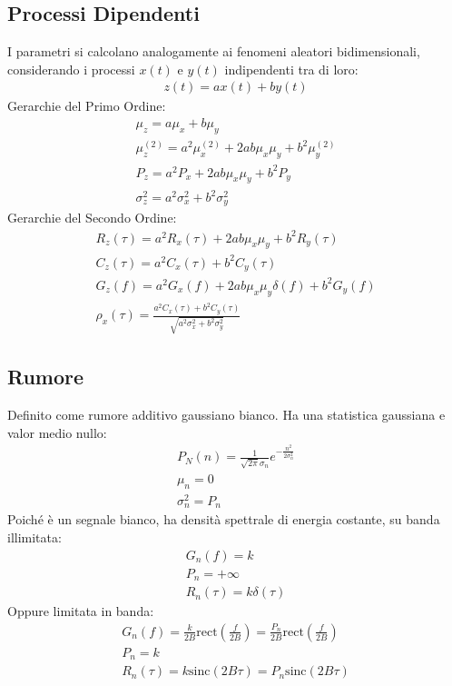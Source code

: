 \documentclass{article}
\newcommand{\rect}{\mathrm{rect}}
\newcommand{\sinc}{\mathrm{sinc}}
\begin{document}
\subsection*{Processi Dipendenti}
I parametri si calcolano analogamente ai fenomeni aleatori bidimensionali, considerando i processi $x(t)$ e $y(t)$ indipendenti tra di loro:
\begin{gather*}
    z(t)=ax(t)+by(t)
\end{gather*}
Gerarchie del Primo Ordine:
\begin{gather*}
    \mu_z=a\mu_x+b\mu_y\\
    \mu_z^{(2)}=a^2\mu_x^{(2)}+2ab\mu_x\mu_y+b^2\mu_y^{(2)}\\   
    P_z=a^2P_x+2ab\mu_x\mu_y+b^2P_y\\
    \sigma_z^2=a^2\sigma_x^2+b^2\sigma_y^2
\end{gather*}
Gerarchie del Secondo Ordine:
\begin{gather*}
    R_z(\tau)=a^2R_x(\tau)+2ab\mu_x\mu_y+b^2R_y(\tau)\\
    C_z(\tau)=a^2C_x(\tau)+b^2C_y(\tau)\\
    G_z(f)=a^2G_x(f)+2ab\mu_x\mu_y\delta(f)+b^2G_y(f)\\
    \rho_x(\tau)=\displaystyle\frac{a^2C_x(\tau)+b^2C_y(\tau)}{\sqrt{a^2\sigma_x^2+b^2\sigma_y^2}}
\end{gather*}
\subsection*{Rumore}
Definito come rumore additivo gaussiano bianco. Ha una statistica gaussiana e valor medio nullo:
\begin{gather*}
    P_N(n)=\displaystyle\frac{1}{\sqrt{2\pi}\sigma_n}e^{-\frac{n^2}{2\sigma_n^2}}\\
    \mu_n=0\\
    \sigma_n^2=P_n
\end{gather*}
Poiché è un segnale bianco, ha densità spettrale di energia costante, su banda illimitata:
\begin{gather*}
    G_n(f)=k\\
    P_n=+\infty\\
    R_n(\tau)=k\delta(\tau)
\end{gather*}
Oppure limitata in banda:
\begin{gather*}
    G_n(f)=\frac{k}{2B}\rect\left(\displaystyle\frac{f}{2B}\right)=\frac{P_n}{2B}\rect\left(\displaystyle\frac{f}{2B}\right)\\
    P_n=k\\
    R_n(\tau)=k\sinc\left(2B\tau\right)=P_n\sinc(2B\tau)
\end{gather*}
\end{document}

